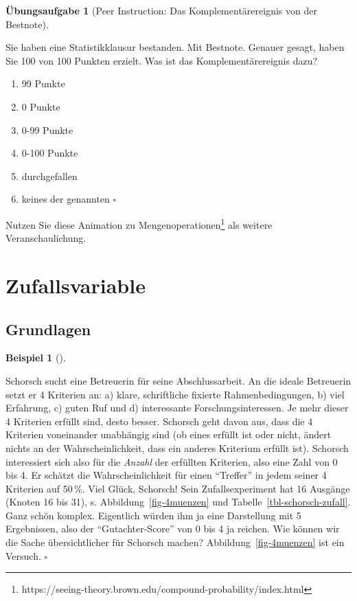 \documentclass[
  ngerman,
  letterpaper,
  twoside,
  open=any]{scrbook}
\providecommand{\tightlist}{%
  \setlength{\itemsep}{0pt}\setlength{\parskip}{0pt}}\usepackage{longtable,booktabs,array}
\theoremstyle{definition}
\newtheorem{example}{Beispiel}[chapter]
\theoremstyle{plain}
\theoremstyle{definition}
\newtheorem{exercise}{Übungsaufgabe}[chapter]
\theoremstyle{definition}
\theoremstyle{definition}
\newtheorem{example}{Beispiel}[chapter]
\theoremstyle{definition}
\newtheorem{exercise}{Übungsaufgabe}[chapter]
\theoremstyle{remark}
\begin{document}
\begin{exercise}[Peer Instruction: Das Komplementärereignis von der
Bestnote]\protect\hypertarget{exr-komplement}{}\label{exr-komplement}

Sie haben eine Statistikklausur bestanden. Mit Bestnote. Genauer gesagt,
haben Sie 100 von 100 Punkten erzielt. Was ist das Komplementärereignis
dazu?

\begin{enumerate}
\def\labelenumi{\Alph{enumi})}
\tightlist
\item
  99 Punkte
\item
  0 Punkte
\item
  0-99 Punkte
\item
  0-100 Punkte
\item
  durchgefallen
\item
  keines der genannten \(\square\)
\end{enumerate}

\end{exercise}

Nutzen Sie diese Animation zu Mengenoperationen\footnote{https://seeing-theory.brown.edu/compound-probability/index.html}
als weitere Veranschaulichung.

\section{Zufallsvariable}\label{zufallsvariable}

\subsection{Grundlagen}\label{grundlagen-1}

\begin{example}[]\protect\hypertarget{exm-thesis}{}\label{exm-thesis}

Schorsch sucht eine Betreuerin für seine Abschlussarbeit. An die ideale
Betreuerin setzt er 4 Kriterien an: a) klare, schriftliche fixierte
Rahmenbedingungen, b) viel Erfahrung, c) guten Ruf und d) interessante
Forschungsinteressen. Je mehr dieser 4 Kriterien erfüllt sind, desto
besser. Schorsch geht davon aus, dass die 4 Kriterien voneinander
unabhängig sind (ob eines erfüllt ist oder nicht, ändert nichts an der
Wahrscheinlichkeit, dass ein anderes Kriterium erfüllt ist). Schorsch
interessiert sich also für die \emph{Anzahl} der erfüllten Kriterien,
also eine Zahl von 0 bis 4. Er schätzt die Wahrscheinlichkeit für einen
\enquote{Treffer} in jedem seiner 4 Kriterien auf 50\,\%. Viel Glück,
Schorsch! Sein Zufallsexperiment hat 16 Ausgänge (Knoten 16 bis 31), s.
Abbildung~\ref{fig-4muenzen} und Tabelle~\ref{tbl-schorsch-zufall}. Ganz
schön komplex. Eigentlich würden ihm ja eine Darstellung mit 5
Ergebnissen, also der \enquote{Gutachter-Score} von 0 bis 4 ja reichen.
Wie können wir die Sache übersichtlicher für Schorsch machen?
Abbildung~\ref{fig-4muenzen} ist ein Versuch. \(\square\)

\end{example}
\end{document}

